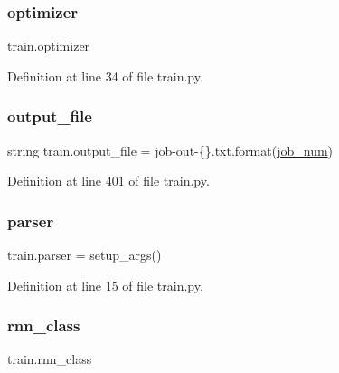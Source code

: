 \mbox{\label{namespacetrain_a776bc60eeb05cde09a691e2daf0da7bd}} 
\subsubsection{\texorpdfstring{optimizer}{optimizer}}
{\footnotesize\ttfamily train.\+optimizer}



Definition at line 34 of file train.\+py.

\mbox{\label{namespacetrain_aeaa702306f07912976fe68c59b1a1bcd}} 
\subsubsection{\texorpdfstring{output\+\_\+file}{output\_file}}
{\footnotesize\ttfamily string train.\+output\+\_\+file = \textquotesingle{}job-\/out-\/\{\}.txt\textquotesingle{}.format(\hyperlink{namespacetrain_aa21180e9a522633e69afac0c0e608b85}{job\+\_\+num})}



Definition at line 401 of file train.\+py.

\mbox{\label{namespacetrain_a242e49c387b90838a9072c79886a10ec}} 
\subsubsection{\texorpdfstring{parser}{parser}}
{\footnotesize\ttfamily train.\+parser = setup\+\_\+args()}



Definition at line 15 of file train.\+py.

\mbox{\label{namespacetrain_a1be63dba1a4c401472a942516cef7810}} 
\subsubsection{\texorpdfstring{rnn\+\_\+class}{rnn\_class}}
{\footnotesize\ttfamily train.\+rnn\+\_\+class}



